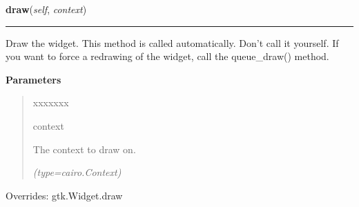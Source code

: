     \vspace{0.5ex}

\hspace{.8\funcindent}\begin{boxedminipage}{\funcwidth}

    \raggedright \textbf{draw}(\textit{self}, \textit{context})

    \vspace{-1.5ex}

    \rule{\textwidth}{0.5\fboxrule}
\setlength{\parskip}{2ex}
    Draw the widget. This method is called automatically. Don't call it 
    yourself. If you want to force a redrawing of the widget, call the 
    queue\_draw() method.

\setlength{\parskip}{1ex}
      \textbf{Parameters}
      \vspace{-1ex}

      \begin{quote}
        \begin{Ventry}{xxxxxxx}

          \item[context]

          The context to draw on.

            {\it (type=cairo.Context)}

        \end{Ventry}

      \end{quote}

      Overrides: gtk.Widget.draw

    \end{boxedminipage}

    \vspace{0.5ex}


